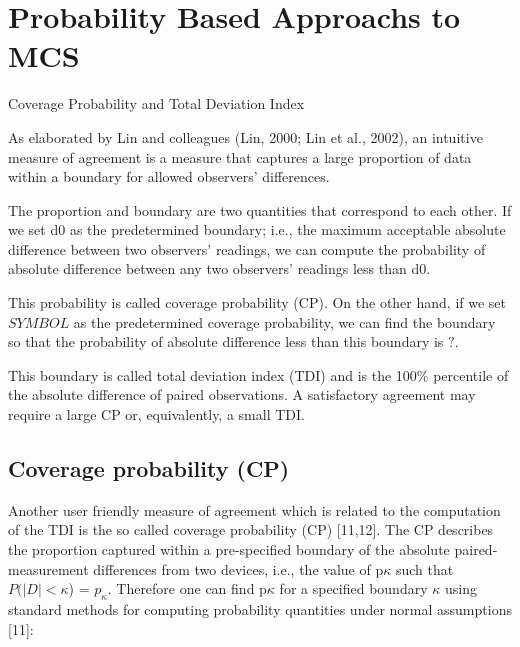 \documentclass[MAIN.tex]{subfiles}
\begin{document}
	
	\section{Probability Based Approachs to MCS}
	
	
	Coverage Probability and Total Deviation Index
	
	As elaborated by Lin and colleagues (Lin, 2000; Lin et al., 2002), an intuitive measure of
	agreement is a measure that captures a large proportion of data within a boundary for allowed
	observers’ differences. 
	
	The proportion and boundary are two quantities that correspond to
	each other. If we set d0 as the predetermined boundary; i.e., the maximum acceptable
	absolute difference between two observers’ readings, we can compute the probability of absolute
	difference between any two observers’ readings less than d0. 
	
	This probability is called
	coverage probability (CP). On the other hand, if we set $SYMBOL$ as the predetermined coverage
	probability, we can find the boundary so that the probability of absolute difference less than this boundary is $?$. 
	
	
	This boundary is called total deviation index (TDI) and is the 
	100$\%$
	percentile of the absolute difference of paired observations. A satisfactory agreement may
	require a large CP or, equivalently, a small TDI.
	
	
	
	
	\subsection*{Coverage probability (CP)}
	Another user friendly measure of agreement which is related to the computation of the TDI is the so called coverage probability (CP) [11,12]. 
	The CP describes the proportion captured within a pre-specified boundary of the absolute paired-measurement differences from two devices, i.e., the value of p$\kappa$ such that $P(|D| < \kappa$) = $p_\kappa$. Therefore one can find p$\kappa$ for a specified boundary $\kappa$ using standard methods for computing probability quantities under normal assumptions [11]:
	
\end{document}

